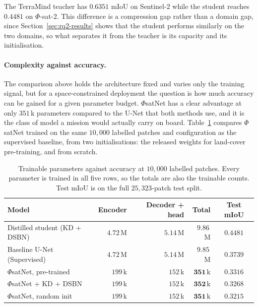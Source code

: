 The TerraMind teacher has $0.6351$ mIoU on Sentinel-2 while the student reaches $0.4481$ on $\Phi$-sat-2.
This difference is a compression gap rather than a domain gap, since Section~\ref{sec:rq2-results} shows that the student performs similarly on the two domains, so what separates it from the teacher is its capacity and its initialisation.

\paragraph{Complexity against accuracy.}

The comparison above holds the architecture fixed and varies only the training signal, but for a space-constrained deployment the question is how much accuracy can be gained for a given parameter budget.
$\Phi$satNet has a clear advantage at only $351$\,k parameters compared to the U-Net that both methods use, and it is the class of model a mission would actually carry on board.
Table~\ref{tab:complexity} compares $\Phi$satNet trained on the same $10{,}000$ labelled patches and configuration as the supervised baseline, from two initialisations: the released weights for land-cover pre-training, and from scratch.

\begin{table}[htbp]
    \centering
    \begin{tabular}{lrrrc}
        \toprule
        Model                         & Encoder   & Decoder + head & Total             & Test mIoU         \\
        \midrule
        Distilled student (KD + DSBN) & $4.72$\,M & $5.14$\,M      & $9.86$\,M         & $\mathbf{0.4481}$ \\
        Baseline U-Net (Supervised)     & $4.72$\,M & $5.14$\,M      & $9.85$\,M         & $0.3739$          \\
        $\Phi$satNet, pre-trained     & $199$\,k  & $152$\,k       & $\mathbf{351}$\,k & $0.3316$          \\
        $\Phi$satNet + KD + DSBN      & $199$\,k  & $152$\,k       & $\mathbf{352}$\,k & $0.3268$          \\
        $\Phi$satNet, random init     & $199$\,k  & $152$\,k       & $\mathbf{351}$\,k & $0.3215$          \\
        \bottomrule
    \end{tabular}
    \caption[Model Complexity and Accuracy]{Trainable parameters against accuracy at $10{,}000$ labelled patches.
        Every parameter is trained in all five rows, so the totals are also the trainable counts.
        Test mIoU is on the full $25{,}323$-patch test split.
    }
    \label{tab:complexity}
\end{table}

